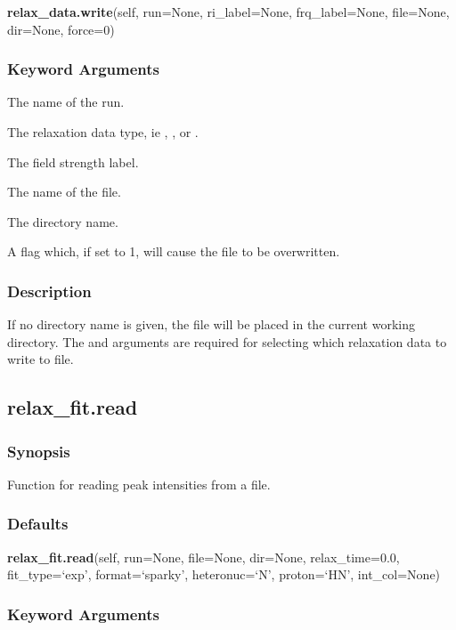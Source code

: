 \textsf{\textbf{relax\_data.write}(self, run=None, ri\_label=None, frq\_label=None, file=None, dir=None, force=0)}


\subsubsection{Keyword Arguments}


  The name of the run.

  The relaxation  data type, ie 
, 
, or 
.

  The field strength label.

  The name of the file.

  The directory name.

  A flag which, if set to 1, will cause the file to be overwritten.

\subsubsection{Description}

If no directory name is given, the file will be placed in the current working directory.
The 
 and 
 arguments are required for selecting which relaxation  data
to write  to file.


\newpage

\subsection{relax\_fit.read}


\subsubsection{Synopsis}

Function for reading peak intensities from a file.

\subsubsection{Defaults}

\textsf{\textbf{relax\_fit.read}(self, run=None, file=None, dir=None, relax\_time=0.0, fit\_type=`exp', format=`sparky', heteronuc=`N', proton=`HN', int\_col=None)}


\subsubsection{Keyword Arguments}


